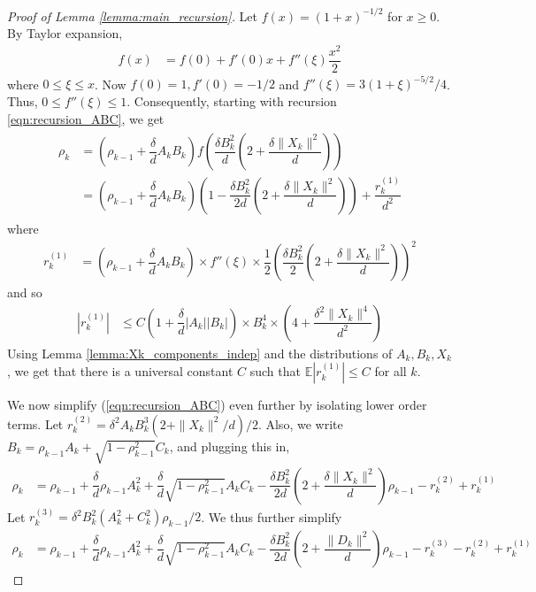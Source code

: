 \documentclass[12pt]{article}
\newcommand{\E}{\mathbb{E}}
\begin{document}
\begin{proof}[Proof of Lemma \ref{lemma:main_recursion}]
    Let $f(x)=(1+x)^{-1/2}$ for $x\geq 0$. By Taylor expansion,
    \begin{align*}
        f(x) &= f(0) + f'(0)x + f''(\xi)\dfrac{x^2}{2}
    \end{align*}where $0\leq \xi\leq x$. Now $f(0)=1, f'(0)=-1/2$ and $f''(\xi)=3(1+\xi)^{-5/2}/4$. Thus, $0\leq f''(\xi)\leq 1$. Consequently, starting with recursion \ref{eqn:recursion_ABC}, we get
    \begin{align}\label{eqn:rho_expand}
    \begin{split}
        \rho_k &= \left(\rho_{k-1}+\dfrac{\delta}{d}A_kB_k\right)f\left(\dfrac{\delta B_k^2}{d}\left(2 + \dfrac{\delta\|X_k\|^2}{d}\right)\right)\\
        &=\left(\rho_{k-1} + \dfrac{\delta}{d}A_kB_k\right)\left(1 - \dfrac{\delta B_k^2}{2d}\left(2 + \dfrac{\delta\|X_k\|^2}{d}\right)\right) + \dfrac{r_k^{(1)}}{d^2}
    \end{split}
    \end{align}where
    \begin{align}\label{eqn:rk}
        r_k^{(1)} &= \left(\rho_{k-1}+\dfrac{\delta}{d}A_kB_k\right)\times f''(\xi)\times \dfrac{1}{2}\left(\dfrac{\delta B_k^2}{2}\left(2 + \dfrac{\delta\|X_k\|^2}{d}\right)\right)^2
    \end{align}and so 
    \begin{align*}
        |r_k^{(1)}| &\leq C\left(1 + \dfrac{\delta}{d}|A_k||B_k|\right)\times B_k^4\times\left(4 + \dfrac{\delta^2\|X_k\|^4}{d^2}\right)
    \end{align*}Using Lemma \ref{lemma:Xk_components_indep} and the distributions of $A_k,B_k,X_k$, we get that there is a universal constant $C$ such that $\E|r_k^{(1)}|\leq C$ for all $k$.

We now simplify (\ref{eqn:recursion_ABC}) even further by isolating lower order terms. Let $r_k^{(2)}=\delta^2A_kB_k^3(2 + \|X_k\|^2/d)/2$. Also, we write $B_k=\rho_{k-1}A_k + \sqrt{1-\rho^2_{k-1}}C_k$, and plugging this in,
\begin{align*}
    \rho_k &= \rho_{k-1} + \dfrac{\delta}{d}\rho_{k-1}A_k^2 + \dfrac{\delta}{d}\sqrt{1-\rho_{k-1}^2}A_kC_k -\dfrac{\delta B_k^2}{2d}\left(2 + \dfrac{\delta\|X_k\|^2}{d}\right)\rho_{k-1} - r_k^{(2)} + r_k^{(1)}
\end{align*}
Let $r_k^{(3)}=\delta^2 B_k^2(A_k^2+C_k^2)\rho_{k-1}/2$. We thus further simplify
\begin{align*}
    \rho_k &= \rho_{k-1} + \dfrac{\delta}{d}\rho_{k-1}A_k^2 + \dfrac{\delta}{d}\sqrt{1-\rho_{k-1}^2}A_kC_k -\dfrac{\delta B_k^2}{2d}\left(2 + \dfrac{\|D_k\|^2}{d}\right)\rho_{k-1} -r_k^{(3)}- r_k^{(2)} + r_k^{(1)}
\end{align*}


\end{proof}
\end{document}
